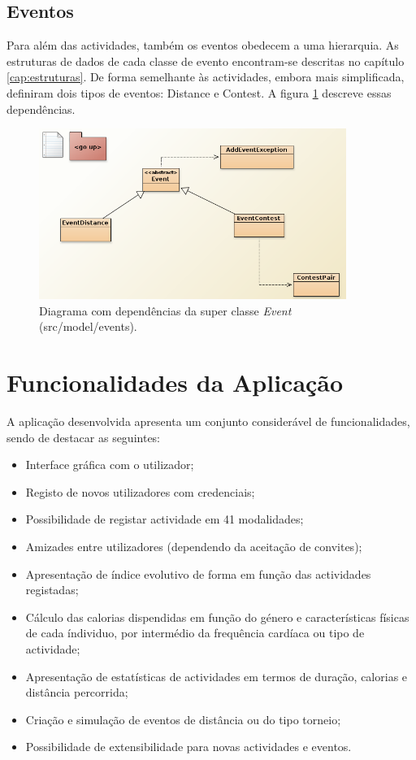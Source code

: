 \documentclass[a4paper,10pt]{report}
\begin{document}
\subsection{Eventos}
\label{subsec:eventosDiagrama}
Para além das actividades, também os eventos obedecem a uma hierarquia.
As estruturas de dados de cada classe de evento encontram-se descritas no capítulo \ref{cap:estruturas}.
De forma semelhante às actividades, embora mais simplificada, definiram dois tipos de eventos: Distance e Contest.
A figura \ref{fig:eventDiagram} descreve essas dependências.

\begin{figure}
\centering
\includegraphics[width=10cm]{events.png}
\caption{Diagrama com dependências da super classe \emph{Event} (src/model/events).}
\label{fig:eventDiagram}
\end{figure}

\section{Funcionalidades da Aplicação}
\label{sec:funcionalidades}
A aplicação desenvolvida apresenta um conjunto considerável de funcionalidades, sendo de destacar as seguintes:

\begin{itemize}
 \item Interface gráfica com o utilizador;
 \item Registo de novos utilizadores com credenciais;
 \item Possibilidade de registar actividade em 41 modalidades;
 \item Amizades entre utilizadores (dependendo da aceitação de convites);
 \item Apresentação de índice evolutivo de forma em função das actividades registadas;
 \item Cálculo das calorias dispendidas em função do género e características físicas de cada índividuo, 
	  por intermédio da frequência cardíaca ou tipo de actividade;
 \item Apresentação de estatísticas de actividades em termos de duração, calorias e distância percorrida;
 \item Criação e simulação de eventos de distância ou do tipo torneio;
 \item Possibilidade de extensibilidade para novas actividades e eventos.
\end{itemize}
\end{document}
